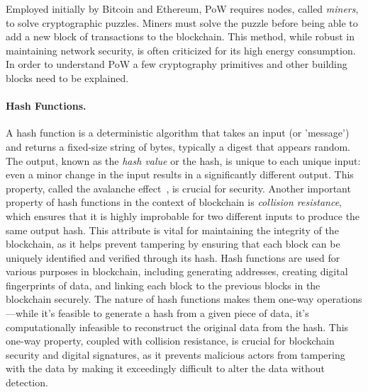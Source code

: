 Employed initially by Bitcoin and Ethereum, PoW requires nodes, called \textit{miners}, to solve cryptographic puzzles. Miners must solve the puzzle before being able to add a new block of transactions to the blockchain. This method, while robust in maintaining network security, is often criticized for its high energy consumption. In order to understand PoW a few cryptography primitives and other building blocks need to be explained.


\paragraph{Hash Functions.}
A hash function is a deterministic algorithm that takes an input (or 'message') and returns a fixed-size string of bytes, typically a digest that appears random. The output, known as the \textit{hash value} or the hash, is unique to each unique input: even a minor change in the input results in a significantly different output. This property, called the avalanche effect~\cite{feistel1973cryptography}, is crucial for security. Another important property of hash functions in the context of blockchain is \textit{collision resistance}, which ensures that it is highly improbable for two different inputs to produce the same output hash. This attribute is vital for maintaining the integrity of the blockchain, as it helps prevent tampering by ensuring that each block can be uniquely identified and verified through its hash. Hash functions are used for various purposes in blockchain, including generating addresses, creating digital fingerprints of data, and linking each block to the previous blocks in the blockchain securely. The nature of hash functions makes them one-way operations---while it's feasible to generate a hash from a given piece of data, it's computationally infeasible to reconstruct the original data from the hash. This one-way property, coupled with collision resistance, is crucial for blockchain security and digital signatures, as it prevents malicious actors from tampering with the data by making it exceedingly difficult to alter the data without detection.


